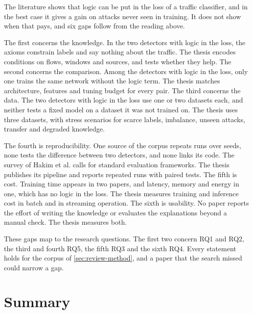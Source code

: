 The literature shows that logic can be put in the loss of a traffic classifier,
and in the best case it gives a gain on attacks never seen in training. It
does not show when that pays, and six gaps follow from the reading above.

The first concerns the knowledge. In the two detectors with logic in the loss,
the axioms constrain labels and say nothing about the traffic. The thesis
encodes conditions on flows, windows and sources, and tests whether they help.
The second concerns the comparison. Among the detectors with logic in the
loss, only one trains the same network without the logic term. The thesis
matches architecture, features and tuning budget for every pair. The third
concerns the data. The two detectors with logic in the loss use one or two
datasets each, and neither tests a fixed model on a dataset it was not trained
on. The thesis uses three datasets, with stress scenarios for scarce
labels, imbalance, unseen attacks, transfer and degraded knowledge.

The fourth is reproducibility. One source of the corpus repeats runs over seeds,
none tests the difference between two detectors, and none links its code. The
survey of Hakim et al. calls for standard evaluation frameworks. The thesis
publishes its pipeline and reports repeated runs with paired tests. The fifth is
cost. Training time appears in two papers, and latency, memory and energy in
one, which has no logic in the loss.
The thesis measures training and inference cost in batch and in streaming
operation. The sixth is usability. No paper reports the effort of writing the
knowledge or evaluates the explanations beyond a manual check. The thesis
measures both.

These gaps map to the research questions. The first two concern RQ1 and RQ2,
the third and fourth RQ5, the fifth RQ3 and the sixth RQ4. Every statement
holds for the corpus of \cref{sec:review-method}, and a paper that the search
missed could narrow a gap.

\section{Summary}
\label{sec:ch6-summary}

